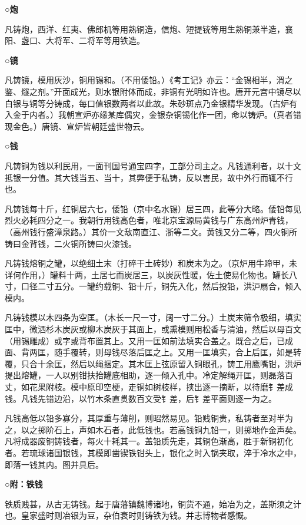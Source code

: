 \documentclass[]{article}
\begin{document}
\textbf{○炮}

凡铸炮，西洋、红夷、佛郎机等用熟铜造，信炮、短提铳等用生熟铜兼半造，襄阳、盏口、大将军、二将军等用铁造。

\textbf{○镜}

凡铸镜，模用灰沙，铜用锡和。（不用倭铅。）《考工记》亦云：``金锡相半，渭之鉴、燧之剂。''开面成光，则水银附体而成，非铜有光明如许也。唐开元宫中镜尽以白银与铜等分铸成，每口值银数两者以此故。朱砂斑点乃金银精华发现。（古炉有入金于内者。）我朝宣炉亦缘某库偶灾，金银杂铜锡化作一团，命以铸炉。（真者错现金色。）唐镜、宣炉皆朝廷盛世物云。

\textbf{○钱}

凡铸铜为钱以利民用，一面刊国号通宝四字，工部分司主之。凡钱通利者，以十文抵银一分值。其大钱当五、当十，其弊便于私铸，反以害民，故中外行而辄不行也。

凡铸钱每十斤，红铜居六七，倭铅（京中名水锡）居三四，此等分大略。倭铅每见烈火必耗四分之一。我朝行用钱高色者，唯北京宝源局黄钱与广东高州炉青钱，（高州钱行盛漳泉路。）其价一文敌南直江、浙等二文。黄钱又分二等，四火铜所铸曰金背钱，二火铜所铸曰火漆钱。

凡铸钱熔铜之罐，以绝细土末（打碎干土砖妙）和炭末为之。（京炉用牛蹄甲，未详何作用，）罐料十两，土居七而炭居三，以炭灰性暖，佐土使易化物也。罐长八寸，口径二寸五分。一罐约载铜、铅十斤，铜先入化，然后投铅，洪沪扇合，倾入模内。

凡铸钱模以木四条为空匡。（木长一尺一寸，阔一寸二分。）土炭末筛令极细，填实匡中，微洒杉木炭灰或柳木炭灰于其面上，或熏模则用松香与清油，然后以母百文（用锡雕成）或字或背布置其上。又用一匡如前法填实合盖之。既合之后，已成面、背两匡，随手覆转，则母钱尽落后匡之上。又用一匡填实，合上后匡，如是转覆，只合十余匡，然后以绳捆定。其木匡上弦原留入铜眼孔，铸工用鹰嘴钳，洪炉提出熔罐，一人以别钳扶抬罐底相助，逐一倾入孔中。冷定解绳开匡，则磊落百丈，如花果附枝。模中原印空梗，走铜如树枝样，挟出逐一摘断，以待磨钅差成钱。凡钱先错边沿，以竹木条直贯数百文受钅差，后钅差平面则逐一为之。

凡钱高低以铅多寡分，其厚重与薄削，则昭然易见。铅贱铜贵，私铸者至对半为之，以之掷阶石上，声如木石者，此低钱也。若高钱铜九铅一，则掷地作金声矣。凡将成器废铜铸钱者，每火十耗其一。盖铅质先走，其铜色渐高，胜于新铜初化者。若琉球诸国银钱，其模即凿锲铁钳头上，银化之时入锅夹取，淬于冷水之中，即落一钱其内。图并具后。

\textbf{○附：铁钱}

铁质贱甚，从古无铸钱。起于唐藩镇魏博诸地，铜货不通，始冶为之，盖斯须之计也。皇家盛时则冶银为豆，杂伯衰时则铸铁为钱。并志博物者感慨。
\end{document}
